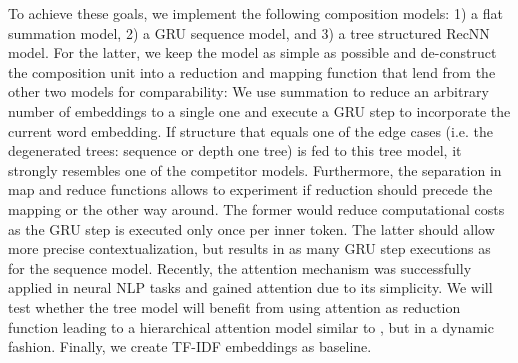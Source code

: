 To achieve these goals, we implement the following composition models: 1) a flat summation model, 2) a \ac{GRU} \autocite{cho_properties_2014} sequence model, and 3) a tree structured \ac{RecNN} model. For the latter, we keep the model as simple as possible and de-construct  the composition unit into a reduction and mapping function that lend from the other two models for comparability: We use summation to reduce an arbitrary number of embeddings to a single one and execute a \ac{GRU} step to incorporate the current word embedding. If structure that equals one of the edge cases (i.e. the degenerated trees: sequence or depth one tree) is fed to this tree model, it strongly resembles one of the competitor models. Furthermore, the separation in map and reduce functions allows to experiment if reduction should precede the mapping or the other way around. The former would reduce computational costs as the \ac{GRU} step is executed only once per inner token. The latter should allow more precise contextualization, but results in as many \ac{GRU} step executions as for the sequence model. Recently, the attention mechanism \autocite{bahdanau_neural_2014,xu_show_2015} was successfully applied in neural \ac{NLP} tasks \autocite{zhuang_neobility_2017,vaswani_attention_2017} and gained attention due to its simplicity. We will test whether the tree model will benefit from using attention as reduction function leading to a hierarchical attention model similar to \textcite{yang_hierarchical_2016}, but in a dynamic fashion. %
Finally, we create \ac{TF-IDF} embeddings as baseline. 

